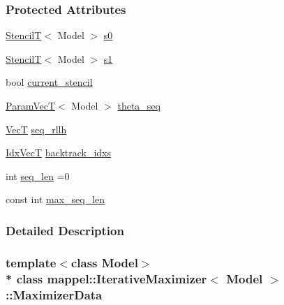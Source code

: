 \subsubsection*{Protected Attributes}
\begin{DoxyCompactItemize}
\item 
\hyperlink{namespacemappel_a3a06598240007876f8c4bf834ad86197}{StencilT}$<$ Model $>$ \hyperlink{classmappel_1_1IterativeMaximizer_1_1MaximizerData_a1a3b8f9693e769eded9fe76751fa49c1}{s0}
\item 
\hyperlink{namespacemappel_a3a06598240007876f8c4bf834ad86197}{StencilT}$<$ Model $>$ \hyperlink{classmappel_1_1IterativeMaximizer_1_1MaximizerData_a3c0f6ec4ba531dfefe8e4b73f537192d}{s1}
\item 
bool \hyperlink{classmappel_1_1IterativeMaximizer_1_1MaximizerData_a321e112eacabe76c882ea8976efb0e9b}{current\+\_\+stencil}
\item 
\hyperlink{namespacemappel_a0f86d3153e4e27b095012f140eea58de}{Param\+VecT}$<$ Model $>$ \hyperlink{classmappel_1_1IterativeMaximizer_1_1MaximizerData_a2c8a2c8724b6f507cd8d4a2b6310324f}{theta\+\_\+seq}
\item 
\hyperlink{namespacemappel_a2225ad69f358daa3f4f99282a35b9a3a}{VecT} \hyperlink{classmappel_1_1IterativeMaximizer_1_1MaximizerData_aaf6e3749e8bf4e8714bac4a48902a4cb}{seq\+\_\+rllh}
\item 
\hyperlink{namespacemappel_ac63743dcd42180127307cd0e4ecdd784}{Idx\+VecT} \hyperlink{classmappel_1_1IterativeMaximizer_1_1MaximizerData_a088734ca36fdf979d8e57779352b2f79}{backtrack\+\_\+idxs}
\item 
int \hyperlink{classmappel_1_1IterativeMaximizer_1_1MaximizerData_a78a56d5ffe0cad0de474e244816748a6}{seq\+\_\+len} =0
\item 
const int \hyperlink{classmappel_1_1IterativeMaximizer_1_1MaximizerData_aee106ddaebe30496f5280095fc01301a}{max\+\_\+seq\+\_\+len}
\end{DoxyCompactItemize}


\subsubsection{Detailed Description}
\subsubsection*{template$<$class Model$>$\\*
class mappel\+::\+Iterative\+Maximizer$<$ Model $>$\+::\+Maximizer\+Data}



